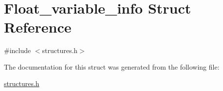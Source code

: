 \hypertarget{structFloat__variable__info}{}\section{Float\+\_\+variable\+\_\+info Struct Reference}
\label{structFloat__variable__info}


{\ttfamily \#include $<$structures.\+h$>$}



The documentation for this struct was generated from the following file\+:\begin{DoxyCompactItemize}
\item 
\hyperlink{structures_8h}{structures.\+h}\end{DoxyCompactItemize}
